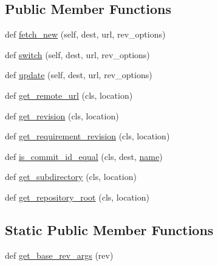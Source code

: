 \subsection*{Public Member Functions}
\begin{DoxyCompactItemize}
\item 
def \hyperlink{classpip_1_1__internal_1_1vcs_1_1mercurial_1_1Mercurial_a7951bc33f0d4f7a510d41c5239c88cdf}{fetch\+\_\+new} (self, dest, url, rev\+\_\+options)
\item 
def \hyperlink{classpip_1_1__internal_1_1vcs_1_1mercurial_1_1Mercurial_a28bb8fa9041775818ff9446a77c44146}{switch} (self, dest, url, rev\+\_\+options)
\item 
def \hyperlink{classpip_1_1__internal_1_1vcs_1_1mercurial_1_1Mercurial_a43f117f7c17f95fe847d20f08c608f58}{update} (self, dest, url, rev\+\_\+options)
\item 
def \hyperlink{classpip_1_1__internal_1_1vcs_1_1mercurial_1_1Mercurial_ac5ed5fbd8053ddc3e53be187130b40b1}{get\+\_\+remote\+\_\+url} (cls, location)
\item 
def \hyperlink{classpip_1_1__internal_1_1vcs_1_1mercurial_1_1Mercurial_a0d54acc1f07012dabd50da919be175a4}{get\+\_\+revision} (cls, location)
\item 
def \hyperlink{classpip_1_1__internal_1_1vcs_1_1mercurial_1_1Mercurial_ae06c07020f616fd116cd5e794e58024d}{get\+\_\+requirement\+\_\+revision} (cls, location)
\item 
def \hyperlink{classpip_1_1__internal_1_1vcs_1_1mercurial_1_1Mercurial_a38234d14a3f91ee0b649a3f6c03f3fd2}{is\+\_\+commit\+\_\+id\+\_\+equal} (cls, dest, \hyperlink{classpip_1_1__internal_1_1vcs_1_1mercurial_1_1Mercurial_ace7de8134914305d1206b35e1a99dc86}{name})
\item 
def \hyperlink{classpip_1_1__internal_1_1vcs_1_1mercurial_1_1Mercurial_ac0f1b0065d98a02edc9d22eb5c90694b}{get\+\_\+subdirectory} (cls, location)
\item 
def \hyperlink{classpip_1_1__internal_1_1vcs_1_1mercurial_1_1Mercurial_ab6533858524d4db94a3152d526cc857e}{get\+\_\+repository\+\_\+root} (cls, location)
\end{DoxyCompactItemize}
\subsection*{Static Public Member Functions}
\begin{DoxyCompactItemize}
\item 
def \hyperlink{classpip_1_1__internal_1_1vcs_1_1mercurial_1_1Mercurial_a3a6d55f32b6e778797fb25e31e0f6997}{get\+\_\+base\+\_\+rev\+\_\+args} (rev)
\end{DoxyCompactItemize}
